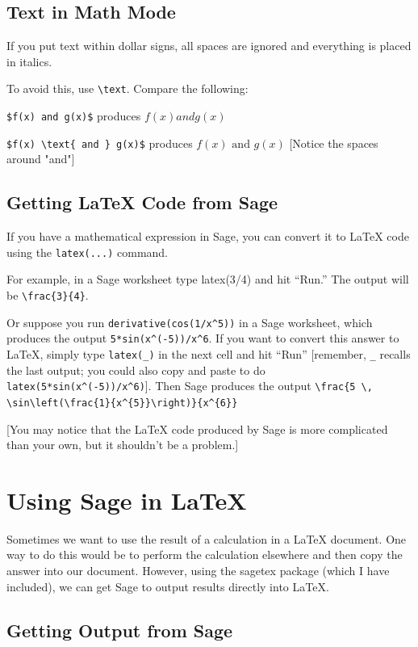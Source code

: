 \documentclass[12pt]{article}
\begin{document}
\subsection{Text in Math Mode}

If you put text within dollar signs, all spaces are ignored and everything is placed in italics.

To avoid this, use \verb|\text|. Compare the following:

\verb|$f(x) and g(x)$| produces $f(x) and g(x)$

\verb|$f(x) \text{ and } g(x)$| produces $f(x) \text{ and } g(x)$ [Notice the spaces around "and"]

\subsection{Getting \LaTeX{} Code from Sage}

If you have a mathematical expression in Sage, you can convert it to \LaTeX{} code using the \texttt{latex(...)} command.

For example, in a Sage worksheet type latex(3/4) and hit ``Run.'' The output will be \verb|\frac{3}{4}|.

Or suppose you run \verb|derivative(cos(1/x^5))| in a Sage worksheet, which produces the output \verb|5*sin(x^(-5))/x^6|. If you want to convert this answer to \LaTeX{}, simply type \verb|latex(_)| in the next cell and hit ``Run'' [remember, \verb|_| recalls the last output; you could also copy and paste to do \verb|latex(5*sin(x^(-5))/x^6)|]. Then Sage produces the output \verb|\frac{5 \, \sin\left(\frac{1}{x^{5}}\right)}{x^{6}}|

[You may notice that the \LaTeX{} code produced by Sage is more complicated than your own, but it shouldn't be a problem.]

\section{Using Sage in \LaTeX}

Sometimes we want to use the result of a calculation in a \LaTeX{} document. One way to do this would be to perform the calculation elsewhere and then copy the answer into our document. However, using the sagetex package (which I have included), we can get Sage to output results directly into \LaTeX{}.

\subsection{Getting Output from Sage}
\end{document}
